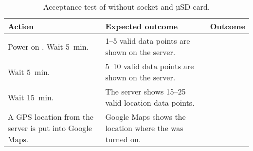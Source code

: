 \begin{table}[H]
	\centering
	\begin{tabularx}{\textwidth}{p{4.3cm} X X}
		\toprule
		\textbf{Action} & \textbf{Expected outcome} & \textbf{Outcome} \\
		\midrule
		Power on \systemName. Wait \SI{5}{\minute}. & \numrange{1}{5} valid data points are shown on the server. & \\
		Wait \SI{5}{\minute}. & \numrange{5}{10} valid data points are shown on the server. & \\
		Wait \SI{15}{\minute}. & The server shows \numrange{15}{25} valid location data points. & \\
		A GPS location from the server is put into Google Maps. & Google Maps shows the location where the \systemName was turned on. & \\
		\bottomrule
	\end{tabularx}
	\caption{Acceptance test of \systemName without \SDsock socket and µSD-card.}
	\label{AT:withoutSD}
\end{table}

\FloatBarrier